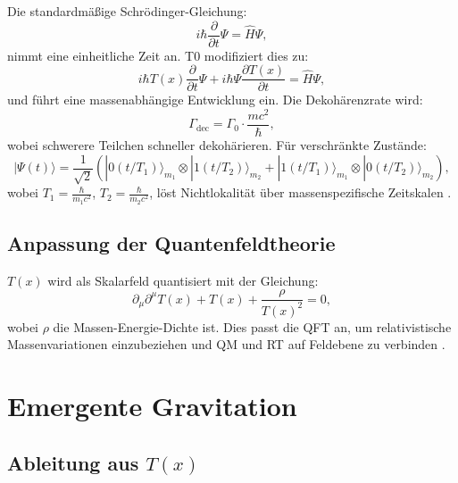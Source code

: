\documentclass[12pt,a4paper]{article}
\newcommand{\Tfield}{T(x)}
\begin{document}
	Die standardmäßige Schrödinger-Gleichung:
	\begin{equation}
		i\hbar \frac{\partial}{\partial t} \Psi = \hat{H} \Psi,
		\label{eq:standard_schrodinger}
	\end{equation}
	nimmt eine einheitliche Zeit an. T0 modifiziert dies zu:
	\begin{equation}
		i\hbar \Tfield \frac{\partial}{\partial t} \Psi + i\hbar \Psi \frac{\partial \Tfield}{\partial t} = \hat{H} \Psi,
		\label{eq:modified_schrodinger}
	\end{equation}
	und führt eine massenabhängige Entwicklung ein. Die Dekohärenzrate wird:
	\begin{equation}
		\Gamma_{\text{dec}} = \Gamma_0 \cdot \frac{m c^2}{\hbar},
		\label{eq:decoherence}
	\end{equation}
	wobei schwerere Teilchen schneller dekohärieren. Für verschränkte Zustände:
	\begin{equation}
		|\Psi(t)\rangle = \frac{1}{\sqrt{2}}(|0(t/T_1)\rangle_{m_1} \otimes |1(t/T_2)\rangle_{m_2} + |1(t/T_1)\rangle_{m_1} \otimes |0(t/T_2)\rangle_{m_2}),
		\label{eq:entangled_state}
	\end{equation}
	wobei \(T_1 = \frac{\hbar}{m_1 c^2}\), \(T_2 = \frac{\hbar}{m_2 c^2}\), löst Nichtlokalität über massenspezifische Zeitskalen \cite{pascher_photons_2025}.
	
	\subsection{Anpassung der Quantenfeldtheorie}
	\label{subsec:qft_extension}
	
	\(\Tfield\) wird als Skalarfeld quantisiert mit der Gleichung:
	\begin{equation}
		\partial_{\mu}\partial^{\mu}\Tfield + \Tfield + \frac{\rho}{\Tfield^2} = 0,
		\label{eq:field_eq}
	\end{equation}
	wobei \(\rho\) die Massen-Energie-Dichte ist. Dies passt die QFT an, um relativistische Massenvariationen einzubeziehen und QM und RT auf Feldebene zu verbinden \cite{pascher_lagrange_2025}.
	
	\section{Emergente Gravitation}
	\label{sec:emergent_grav}
	
	\subsection{Ableitung aus \(\Tfield\)}
	\label{subsec:grav_derivation}
	
\end{document}

